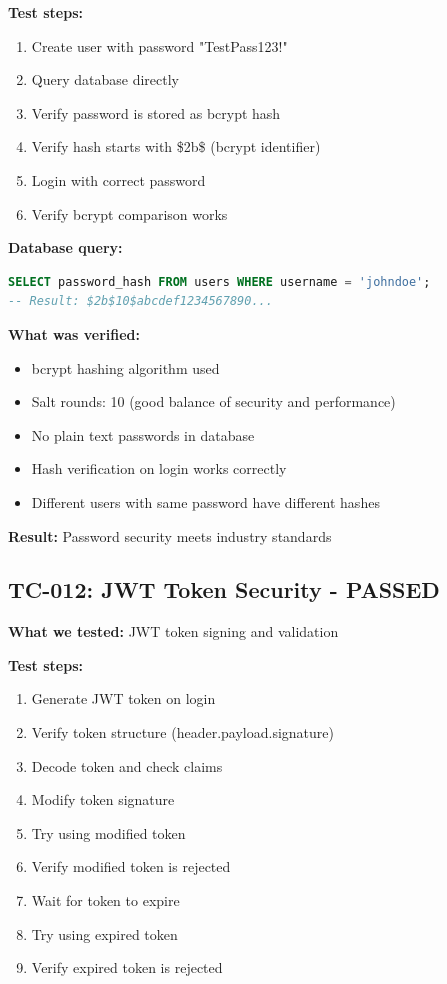 \documentclass[11pt,a4paper]{article}
\begin{document}
\textbf{Test steps:}
\begin{enumerate}
    \item Create user with password "TestPass123!"
    \item Query database directly
    \item Verify password is stored as bcrypt hash
    \item Verify hash starts with \$2b\$ (bcrypt identifier)
    \item Login with correct password
    \item Verify bcrypt comparison works
\end{enumerate}

\textbf{Database query:}
\begin{lstlisting}[language=sql]
SELECT password_hash FROM users WHERE username = 'johndoe';
-- Result: $2b$10$abcdef1234567890...
\end{lstlisting}

\textbf{What was verified:}
\begin{itemize}
    \item bcrypt hashing algorithm used
    \item Salt rounds: 10 (good balance of security and performance)
    \item No plain text passwords in database
    \item Hash verification on login works correctly
    \item Different users with same password have different hashes
\end{itemize}

\textbf{Result:} Password security meets industry standards

\subsection{TC-012: JWT Token Security - PASSED}
\textbf{What we tested:} JWT token signing and validation

\textbf{Test steps:}
\begin{enumerate}
    \item Generate JWT token on login
    \item Verify token structure (header.payload.signature)
    \item Decode token and check claims
    \item Modify token signature
    \item Try using modified token
    \item Verify modified token is rejected
    \item Wait for token to expire
    \item Try using expired token
    \item Verify expired token is rejected
\end{enumerate}
\end{document}
